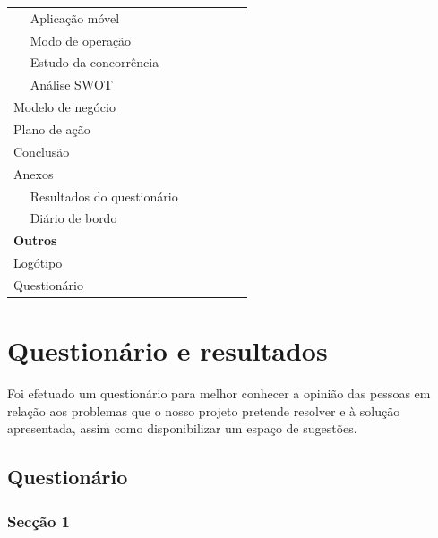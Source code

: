 \documentclass[11pt, a4paper, oneside]{book}
\newcommand*\checkmark{%
  \ding{52}%
}
\begin{document}
\begin{appendices}
\begin{center}
\begin{tabular}{@{} p{12.9em}|p{4.6em}|p{4.6em}|p{4.6em}|p{4.6em}|p{4.6em} @{}}
        ~~ Aplicação móvel & \checkmark & & \checkmark & & \\
        ~~ Modo de operação & \checkmark & & & & \\
        ~~ Estudo da concorrência & \checkmark & & & & \\
        ~~ Análise SWOT & \checkmark & & & & \\
        Modelo de negócio & & & \checkmark & \\
        Plano de ação & & & & & \checkmark \\
        Conclusão & \checkmark & \checkmark & \checkmark & \checkmark & \checkmark \\
        Anexos & & & & & \\
        ~~ Resultados do questionário & & & & \checkmark & \\
        ~~ Diário de bordo & & \checkmark & & \\ \hline
        \textbf{Outros} & & & & & \\
        Logótipo & & & \checkmark & & \\
        Questionário & & & & \checkmark & \\
    \end{tabular}
\end{center}


\chapter{Questionário e resultados}

Foi efetuado um questionário para melhor conhecer a opinião das pessoas em relação aos problemas que o nosso projeto pretende resolver e à solução apresentada, assim como disponibilizar um espaço de sugestões.

\section{Questionário}

\subsection{Secção 1}

\begin{mdframed}[innerleftmargin=7.5mm, innerrightmargin=7.5mm, innertopmargin=7.5mm, innerbottommargin=7.5mm]


\end{mdframed}
\end{appendices}
\end{document}
